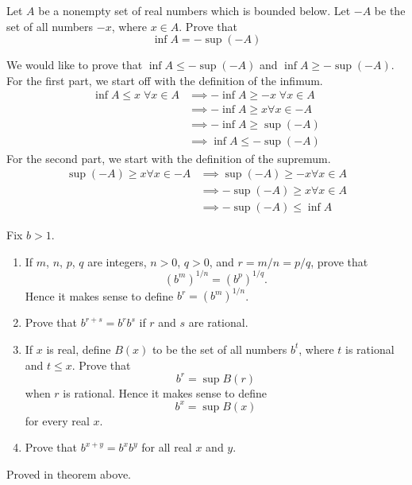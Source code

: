   \begin{exercise}[Rudin 1.5]
    Let $A$ be a nonempty set of real numbers which is bounded below. Let $-A$ be the set of all numbers $-x$, where $x \in A$. Prove that 
    \begin{equation}
      \inf A = -\sup(-A)
    \end{equation}
  \end{exercise}
  \begin{solution}
    We would like to prove that $\inf A \leq -\sup(-A)$ and $\inf A \geq -\sup(-A)$. For the first part, we start off with the definition of the infimum. 
    \begin{align*}
      \inf A \leq x \; \forall x \in A & \implies - \inf A \geq -x \; \forall x \in A \\
      & \implies - \inf A \geq x \forall x \in -A \\
      & \implies -\inf A \geq \sup(-A) \\
      & \implies \inf A \leq - \sup(-A)
    \end{align*}
    For the second part, we start with the definition of the supremum. 
    \begin{align*}
      \sup(-A) \geq x \forall x \in -A & \implies \sup(-A) \geq -x \forall x \in A \\
      & \implies -\sup(-A) \geq x \forall x \in A \\
      & \implies -\sup(-A) \leq \inf A
    \end{align*}
  \end{solution}

  \begin{exercise}[Rudin 1.6]
    Fix $b > 1$.
    \begin{enumerate}
      \item If $m$, $n$, $p$, $q$ are integers, $n > 0$, $q > 0$, and $r = m/n = p/q$, prove that
      \begin{equation}
        (b^m)^{1/n} = (b^p)^{1/q}.
      \end{equation}
      Hence it makes sense to define $b^r = (b^m)^{1/n}$.
      
      \item Prove that $b^{r+s} = b^rb^s$ if $r$ and $s$ are rational.
      
      \item If $x$ is real, define $B(x)$ to be the set of all numbers $b^t$, where $t$ is rational and $t \leq x$. Prove that 
      \begin{equation}
        b^r = \sup B(r)
      \end{equation}
      when $r$ is rational. Hence it makes sense to define
      \begin{equation}
        b^x = \sup B(x)
      \end{equation}
      for every real $x$.
      
      \item Prove that $b^{x+y} = b^xb^y$ for all real $x$ and $y$.
    \end{enumerate}
  \end{exercise}
  \begin{solution}
    Proved in theorem above. 
  \end{solution}


